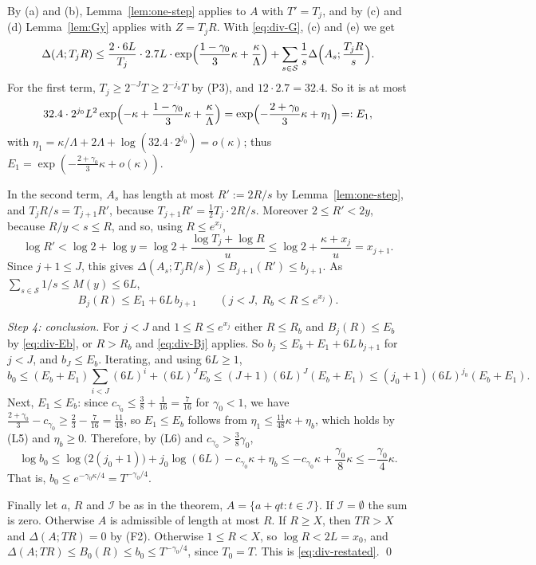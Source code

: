 By (a) and (b), Lemma~\ref{lem:one-step} applies to $A$ with $T'=T_j$, and by (c) and (d) Lemma~\ref{lem:Gy} applies with $Z=T_jR$. With \eqref{eq:div-G}, (c) and (e) we get
\[
\Delta(A;T_jR)\le\frac{2\cdot6L}{T_j}\cdot2.7L\cdot\exp\Bigl(\frac{1-\gamma_0}3\kappa+\frac\kappa\Lambda\Bigr)+\sum_{s\in\mathcal{S}}\frac1s\Delta\Bigl(A_s;\frac{T_jR}s\Bigr).
\]
For the first term, $T_j\ge2^{-J}T\ge2^{-j_0}T$ by (P3), and $12\cdot2.7=32.4$. So it is at most
\[
32.4\cdot2^{j_0}L^2\exp\Bigl(-\kappa+\frac{1-\gamma_0}3\kappa+\frac\kappa\Lambda\Bigr)=\exp\Bigl(-\frac{2+\gamma_0}3\kappa+\eta_1\Bigr)=:E_1,
\]
with $\eta_1=\kappa/\Lambda+2\Lambda+\log(32.4\cdot2^{j_0})=o(\kappa)$; thus $E_1=\exp(-\frac{2+\gamma_0}3\kappa+o(\kappa))$.

In the second term, $A_s$ has length at most $R':=2R/s$ by Lemma~\ref{lem:one-step}, and $T_jR/s=T_{j+1}R'$, because $T_{j+1}R'=\frac12T_j\cdot2R/s$. Moreover $2\le R'<2y$, because $R/y<s\le R$, and so, using $R\le e^{x_j}$,
\[
\log R'<\log2+\log y=\log2+\frac{\log T_j+\log R}u\le\log2+\frac{\kappa+x_j}u=x_{j+1}.
\]
Since $j+1\le J$, this gives $\Delta(A_s;T_jR/s)\le B_{j+1}(R')\le b_{j+1}$. As $\sum_{s\in\mathcal{S}}1/s\le M(y)\le6L$,
\begin{equation}\label{eq:div-Bj}
B_j(R)\le E_1+6L\,b_{j+1}\qquad(j<J,\ R_b<R\le e^{x_j}).
\end{equation}

\medskip\noindent\emph{Step 4: conclusion.} For $j<J$ and $1\le R\le e^{x_j}$ either $R\le R_b$ and $B_j(R)\le E_b$ by \eqref{eq:div-Eb}, or $R>R_b$ and \eqref{eq:div-Bj} applies. So $b_j\le E_b+E_1+6L\,b_{j+1}$ for $j<J$, and $b_J\le E_b$. Iterating, and using $6L\ge1$,
\[
b_0\le(E_b+E_1)\sum_{i<J}(6L)^i+(6L)^JE_b\le(J+1)(6L)^J(E_b+E_1)\le(j_0+1)(6L)^{j_0}(E_b+E_1).
\]
Next, $E_1\le E_b$: since $c_{\gamma_0}\le\frac38+\frac1{16}=\frac7{16}$ for $\gamma_0<1$, we have $\frac{2+\gamma_0}3-c_{\gamma_0}\ge\frac23-\frac7{16}=\frac{11}{48}$, so $E_1\le E_b$ follows from $\eta_1\le\frac{11}{48}\kappa+\eta_b$, which holds by (L5) and $\eta_b\ge0$. Therefore, by (L6) and $c_{\gamma_0}>\frac38\gamma_0$,
\[
\log b_0\le\log\bigl(2(j_0+1)\bigr)+j_0\log(6L)-c_{\gamma_0}\kappa+\eta_b\le-c_{\gamma_0}\kappa+\frac{\gamma_0}8\kappa\le-\frac{\gamma_0}4\kappa .
\]
That is, $b_0\le e^{-\gamma_0\kappa/4}=T^{-\gamma_0/4}$.

Finally let $a$, $R$ and $\mathcal I$ be as in the theorem, $A=\{a+qt:t\in \mathcal I\}$. If $\mathcal I=\emptyset$ the sum is zero. Otherwise $A$ is admissible of length at most $R$. If $R\ge X$, then $TR>X$ and $\Delta(A;TR)=0$ by (F2). Otherwise $1\le R<X$, so $\log R<2L=x_0$, and $\Delta(A;TR)\le B_0(R)\le b_0\le T^{-\gamma_0/4}$, since $T_0=T$. This is \eqref{eq:div-restated}. \qed

